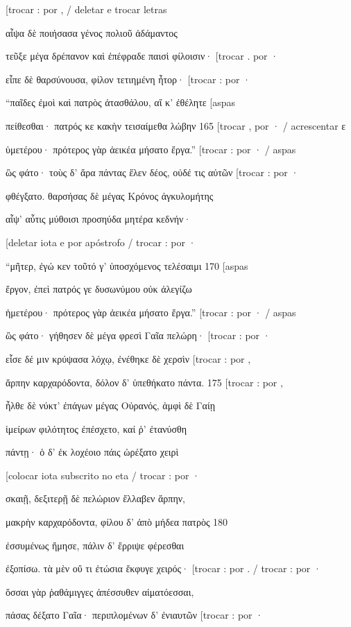 {[}trocar : por , / deletar e trocar letras

αἶψα δὲ ποιήσασα γένος πολιοῦ ἀδάμαντος

τεῦξε μέγα δρέπανον καὶ ἐπέφραδε παισὶ φίλοισιν· {[}trocar . por ·

εἶπε δὲ θαρσύνουσα, φίλον τετιημένη ἦτορ· {[}trocar : por ·

``παῖδες ἐμοὶ καὶ πατρὸς ἀτασθάλου, αἴ κ' ἐθέλητε {[}aspas

πείθεσθαι· πατρός κε κακὴν τεισαίμεθα λώβην 165 {[}trocar , por · /
acrescentar ε

ὑμετέρου· πρότερος γὰρ ἀεικέα μήσατο ἔργα.'' {[}trocar : por · / aspas

ὣς φάτο· τοὺς δ' ἄρα πάντας ἕλεν δέος, οὐδέ τις αὐτῶν {[}trocar : por ·

φθέγξατο. θαρσήσας δὲ μέγας Κρόνος ἀγκυλομήτης

αἶψ' αὖτις μύθοισι προσηύδα μητέρα κεδνήν·

{[}deletar iota e por apóstrofo / trocar : por ·

``μῆτερ, ἐγώ κεν τοῦτό γ' ὑποσχόμενος τελέσαιμι 170 {[}aspas

ἔργον, ἐπεὶ πατρός γε δυσωνύμου οὐκ ἀλεγίζω

ἡμετέρου· πρότερος γὰρ ἀεικέα μήσατο ἔργα.'' {[}trocar : por · / aspas

ὣς φάτο· γήθησεν δὲ μέγα φρεσὶ Γαῖα πελώρη· {[}trocar : por ·

εἷσε δέ μιν κρύψασα λόχῳ, ἐνέθηκε δὲ χερσὶν {[}trocar : por ,

ἅρπην καρχαρόδοντα, δόλον δ' ὑπεθήκατο πάντα. 175 {[}trocar : por ,

ἦλθε δὲ νύκτ' ἐπάγων μέγας Οὐρανός, ἀμφὶ δὲ Γαίῃ

ἱμείρων φιλότητος ἐπέσχετο, καί ῥ' ἐτανύσθη

πάντῃ· ὁ δ' ἐκ λοχέοιο πάις ὠρέξατο χειρὶ

{[}colocar iota subscrito no eta / trocar : por ·

σκαιῇ, δεξιτερῇ δὲ πελώριον ἔλλαβεν ἅρπην,

μακρὴν καρχαρόδοντα, φίλου δ' ἀπὸ μήδεα πατρὸς 180

ἐσσυμένως ἤμησε, πάλιν δ' ἔρριψε φέρεσθαι

ἐξοπίσω. τὰ μὲν οὔ τι ἐτώσια ἔκφυγε χειρός· {[}trocar : por . / trocar :
por ·

ὅσσαι γὰρ ῥαθάμιγγες ἀπέσσυθεν αἱματόεσσαι,

πάσας δέξατο Γαῖα· περιπλομένων δ' ἐνιαυτῶν {[}trocar : por ·

